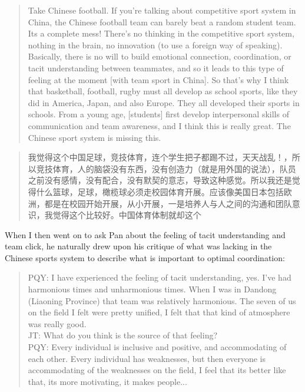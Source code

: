 \begin{CJK}{UTF8}{gbsn}
\begin{quote}
  Take Chinese football.  If you’re talking about competitive sport system in China, the Chinese football team can barely beat a random student team. Its a complete mess! There’s no thinking in the competitive sport system, nothing in the brain, no innovation (to use a foreign way of speaking).  Basically, there is no will to build emotional connection, coordination, or tacit understanding between teammates, and so it leads to this type of feeling at the moment [with team sport in China].  So that's why I think that basketball, football, rugby must all develop as school sports, like they did in America, Japan, and also Europe. They all developed their sports in schools. From a young age, [students] first develop interpersonal skills of communication and team awareness, and I think this is really great.  The Chinese sport system is missing this.
\end{quote}

\begin{quote}
  我觉得这个中国足球，竞技体育，连个学生把子都踢不过，天天战乱！，所以竞技体育，人的脑袋没有东西，没有创造力（就是用外国的说法），队员之前没有感情，没有配合，没有默契的意志，导致这种感觉。所以我还是觉得什么篮球，足球，橄榄球必须走校园体育开展。应该像美国日本包括欧洲，都是在校园开始开展，从小开展，一是培养人与人之间的沟通和团队意识，我觉得这个比较好。中国体育体制就却这个
\end{quote}

When I then went on to ask Pan about the feeling of tacit understanding and team click, he naturally drew upon his critique of what was lacking in the Chinese sports system to describe what is important to optimal coordination:

  \begin{quote}
    PQY: I have experienced the feeling of tacit understanding, yes. I've had harmonious times and unharmonious times. When I was in Dandong (Liaoning Province) that team was relatively harmonious.  The seven of us on the field I felt were pretty unified, I felt that that kind of atmosphere was really good. \\

    JT: What do you think is the source of that feeling? \\

    PQY: Every individual is inclusive and positive, and accommodating of each other. Every individual has weaknesses, but then everyone is accommodating of the weaknesses on the field, I feel that its better like that, its more motivating, it makes people...
  \end{quote}


\end{CJK}

